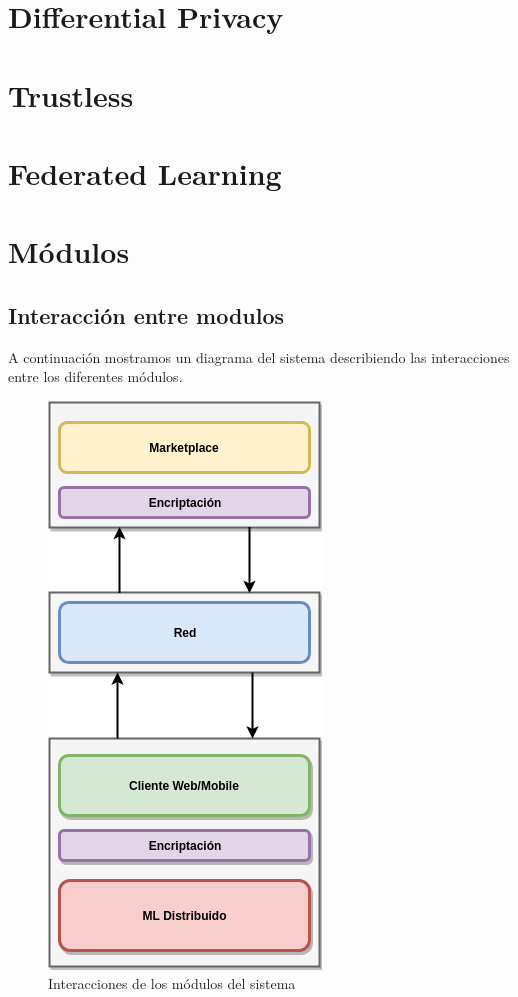 \documentclass[
11pt, %
oneside, %
spanish, %
singlespacing, %
parskip, %
headsepline, %
chapterinoneline, %
]{MastersDoctoralThesis} %
\begin{document}
\section{Differential Privacy}

\section{Trustless}

\section{Federated Learning}



\section{Módulos}

\subsection*{Interacción entre modulos}
A continuación mostramos un diagrama del sistema describiendo las interacciones entre los diferentes módulos. \\

\begin{figure}[h!]
  	\centering
	\includegraphics[scale=0.5]{imgs/modules-diagram.png}
	\caption{Interacciones de los módulos del sistema}
\end{figure}
\end{document}
